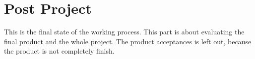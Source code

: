 \chapter{Post Project}
This is the final state of the working process. This part is about evaluating the final product and the whole project. The product acceptances is left out, because the product is not completely finish.
\newpage
\newpage